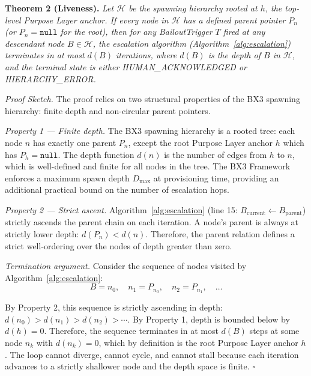 \bigskip

\noindent\textbf{Theorem 2 (Liveness).}
\textit{Let $\mathcal{H}$ be the spawning hierarchy rooted at $h$, the top-level Purpose Layer anchor. If every node in $\mathcal{H}$ has a defined parent pointer $P_n$ (or $P_n = \texttt{null}$ for the root), then for any BailoutTrigger $T$ fired at any descendant node $B \in \mathcal{H}$, the escalation algorithm (Algorithm~\ref{alg:escalation}) terminates in at most $d(B)$ iterations, where $d(B)$ is the depth of $B$ in $\mathcal{H}$, and the terminal state is either HUMAN\_ACKNOWLEDGED or HIERARCHY\_ERROR.}

\bigskip

\noindent\textit{Proof Sketch.} The proof relies on two structural properties of the BX3 spawning hierarchy: finite depth and non-circular parent pointers.

\medskip

\noindent\textit{Property 1 — Finite depth.}
The BX3 spawning hierarchy is a rooted tree: each node $n$ has exactly one parent $P_n$, except the root Purpose Layer anchor $h$ which has $P_h = \texttt{null}$. The depth function $d(n)$ is the number of edges from $h$ to $n$, which is well-defined and finite for all nodes in the tree. The BX3 Framework enforces a maximum spawn depth $D_{\max}$ at provisioning time, providing an additional practical bound on the number of escalation hops.

\medskip

\noindent\textit{Property 2 — Strict ascent.}
Algorithm~\ref{alg:escalation} (line 15: $B_{\text{current}} \leftarrow B_{\text{parent}}$) strictly ascends the parent chain on each iteration. A node's parent is always at strictly lower depth: $d(P_n) < d(n)$. Therefore, the parent relation defines a strict well-ordering over the nodes of depth greater than zero.

\medskip

\noindent\textit{Termination argument.}
Consider the sequence of nodes visited by Algorithm~\ref{alg:escalation}:
\[ B = n_0,\quad n_1 = P_{n_0},\quad n_2 = P_{n_1},\quad \ldots \]

By Property 2, this sequence is strictly ascending in depth: $d(n_0) > d(n_1) > d(n_2) > \cdots$. By Property 1, depth is bounded below by $d(h) = 0$. Therefore, the sequence terminates in at most $d(B)$ steps at some node $n_k$ with $d(n_k) = 0$, which by definition is the root Purpose Layer anchor $h$. The loop cannot diverge, cannot cycle, and cannot stall because each iteration advances to a strictly shallower node and the depth space is finite. $\square$

